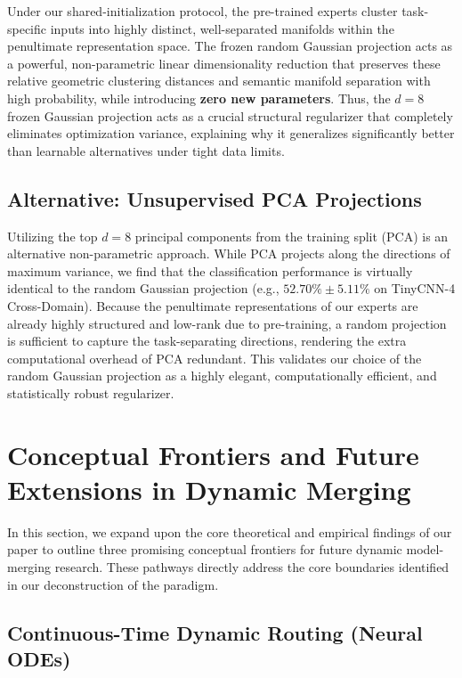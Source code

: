 Under our shared-initialization protocol, the pre-trained experts cluster task-specific inputs into highly distinct, well-separated manifolds within the penultimate representation space. The frozen random Gaussian projection acts as a powerful, non-parametric linear dimensionality reduction that preserves these relative geometric clustering distances and semantic manifold separation with high probability, while introducing \textbf{zero new parameters}. Thus, the $d=8$ frozen Gaussian projection acts as a crucial structural regularizer that completely eliminates optimization variance, explaining why it generalizes significantly better than learnable alternatives under tight data limits.

\subsection{Alternative: Unsupervised PCA Projections}

Utilizing the top $d=8$ principal components from the training split (PCA) is an alternative non-parametric approach. While PCA projects along the directions of maximum variance, we find that the classification performance is virtually identical to the random Gaussian projection (e.g., $52.70\% \pm 5.11\%$ on TinyCNN-4 Cross-Domain). Because the penultimate representations of our experts are already highly structured and low-rank due to pre-training, a random projection is sufficient to capture the task-separating directions, rendering the extra computational overhead of PCA redundant. This validates our choice of the random Gaussian projection as a highly elegant, computationally efficient, and statistically robust regularizer.

\section{Conceptual Frontiers and Future Extensions in Dynamic Merging}
\label{app:conceptual_frontiers}

In this section, we expand upon the core theoretical and empirical findings of our paper to outline three promising conceptual frontiers for future dynamic model-merging research. These pathways directly address the core boundaries identified in our deconstruction of the paradigm.

\subsection{Continuous-Time Dynamic Routing (Neural ODEs)}

